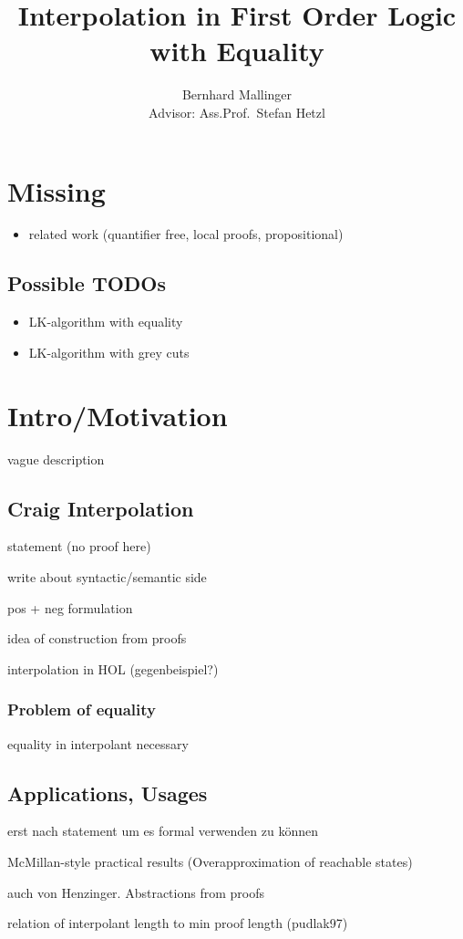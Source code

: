 \documentclass[,%
			paper=a4,%
			DIV12,
			liststotoc,
			bibtotoc,
			draft=false,%
			numbers=noendperiod
			]{scrartcl}
\title{Interpolation in First Order Logic with Equality}
\author{Bernhard Mallinger \medskip \\
Advisor: Ass.Prof.\ Stefan Hetzl}
\theoremstyle{definition}
\begin{document}
\tableofcontents

\section{Missing}
\begin{itemize}
	\item related work (quantifier free, local proofs, propositional)
\end{itemize}

\subsection{Possible TODOs}
\begin{itemize}
	\item LK-algorithm with equality
	\item LK-algorithm with grey cuts
\end{itemize}

\section{Intro/Motivation}

	vague description

	\subsection{Craig Interpolation}
		statement (no proof here)
		
		write about syntactic/semantic side

		pos + neg formulation

		idea of construction from proofs

		interpolation in HOL (gegenbeispiel?)
	\subsubsection{Problem of equality}
		equality in interpolant necessary

	\subsection{Applications, Usages}
		erst nach statement um es formal verwenden zu können

		McMillan-style practical results (Overapproximation of reachable states)

		auch von Henzinger. Abstractions from proofs

		relation of interpolant length to min proof length (pudlak97)
\end{document}
